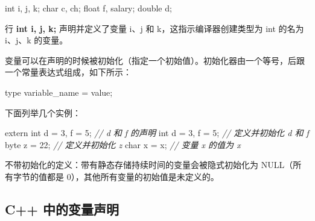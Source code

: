 \documentclass[
]{article}
\newenvironment{Shaded}{}{}
\newcommand{\AttributeTok}[1]{\textcolor[rgb]{0.49,0.56,0.16}{#1}}
\newcommand{\CharTok}[1]{\textcolor[rgb]{0.25,0.44,0.63}{#1}}
\newcommand{\CommentTok}[1]{\textcolor[rgb]{0.38,0.63,0.69}{\textit{#1}}}
\newcommand{\DataTypeTok}[1]{\textcolor[rgb]{0.56,0.13,0.00}{#1}}
\newcommand{\DecValTok}[1]{\textcolor[rgb]{0.25,0.63,0.44}{#1}}
\newcommand{\NormalTok}[1]{#1}
\newcommand{\OperatorTok}[1]{\textcolor[rgb]{0.40,0.40,0.40}{#1}}
\begin{document}
\begin{Shaded}
\begin{Highlighting}[]
\DataTypeTok{int}\NormalTok{    i}\OperatorTok{,}\NormalTok{ j}\OperatorTok{,}\NormalTok{ k}\OperatorTok{;}
\DataTypeTok{char}\NormalTok{   c}\OperatorTok{,}\NormalTok{ ch}\OperatorTok{;}
\DataTypeTok{float}\NormalTok{  f}\OperatorTok{,}\NormalTok{ salary}\OperatorTok{;}
\DataTypeTok{double}\NormalTok{ d}\OperatorTok{;}
\end{Highlighting}
\end{Shaded}

行 \textbf{int i, j, k;} 声明并定义了变量 i、j 和
k，这指示编译器创建类型为 int 的名为 i、j、k 的变量。

变量可以在声明的时候被初始化（指定一个初始值）。初始化器由一个等号，后跟一个常量表达式组成，如下所示：

\begin{Shaded}
\begin{Highlighting}[]
\NormalTok{type variable\_name }\OperatorTok{=}\NormalTok{ value}\OperatorTok{;}
\end{Highlighting}
\end{Shaded}

下面列举几个实例：

\begin{Shaded}
\begin{Highlighting}[]
\AttributeTok{extern} \DataTypeTok{int}\NormalTok{ d }\OperatorTok{=} \DecValTok{3}\OperatorTok{,}\NormalTok{ f }\OperatorTok{=} \DecValTok{5}\OperatorTok{;}   \CommentTok{// d 和 f 的声明 }
\DataTypeTok{int}\NormalTok{ d }\OperatorTok{=} \DecValTok{3}\OperatorTok{,}\NormalTok{ f }\OperatorTok{=} \DecValTok{5}\OperatorTok{;}          \CommentTok{// 定义并初始化 d 和 f}
\NormalTok{byte z }\OperatorTok{=} \DecValTok{22}\OperatorTok{;}               \CommentTok{// 定义并初始化 z}
\DataTypeTok{char}\NormalTok{ x }\OperatorTok{=} \CharTok{\textquotesingle{}x\textquotesingle{}}\OperatorTok{;}              \CommentTok{// 变量 x 的值为 \textquotesingle{}x\textquotesingle{}}
\end{Highlighting}
\end{Shaded}

不带初始化的定义：带有静态存储持续时间的变量会被隐式初始化为
NULL（所有字节的值都是 0），其他所有变量的初始值是未定义的。

\hypertarget{c-ux4e2dux7684ux53d8ux91cfux58f0ux660e}{%
\subsection{C++
中的变量声明}\label{c-ux4e2dux7684ux53d8ux91cfux58f0ux660e}}
\end{document}
